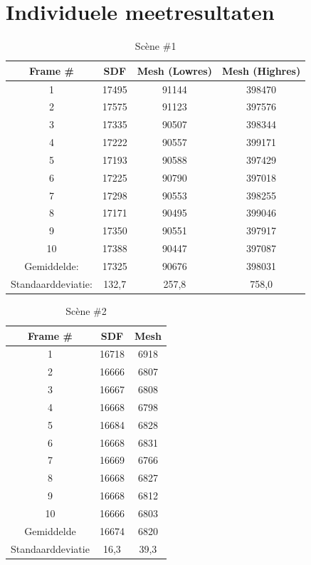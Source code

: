 \documentclass[12pt, a4paper]{article}
\begin{document}
\section{Individuele meetresultaten} \label{resultaten}
\begin{table}[H]
	\centering
	\begin{tabular}{| c | c c c |}
		\hline
		Frame \# & SDF & Mesh (Lowres) & Mesh (Highres) \\
		\hline
		1&17495&91144&398470 \\
		2&17575&91123&397576 \\
		3&17335&90507&398344 \\
		4&17222&90557&399171 \\
		5&17193&90588&397429 \\
		6&17225&90790&397018 \\
		7&17298&90553&398255 \\
		8&17171&90495&399046 \\
		9&17350&90551&397917 \\
		10&17388&90447&397087 \\
		\hline
		Gemiddelde:&17325&90676&398031 \\
		Standaarddeviatie:&132,7&257,8&758,0 \\
		\hline
	\end{tabular}
	\caption{Scène \#1}
\end{table}
\begin{table}[H]
	\centering
	\begin{tabular}{| c | c c |}
		\hline
		Frame \# & SDF & Mesh \\
		\hline
		1 &16718 &6918 \\
		2 &16666 &6807 \\
		3 &16667 &6808 \\
		4 &16668 &6798 \\
		5 &16684 &6828 \\
		6 &16668 &6831 \\
		7 &16669 &6766 \\
		8 &16668 &6827 \\
		9 &16668 &6812 \\
		10 &16666 &6803 \\
		\hline
		Gemiddelde &16674 &6820 \\
		Standaarddeviatie &16,3 &39,3 \\
		\hline
	\end{tabular}
	\caption{Scène \#2}
\end{table}
\end{document}
